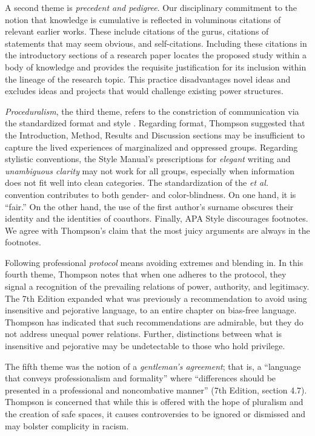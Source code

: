 \documentclass[
  11pt,
]{book}
\begin{document}
A second theme is \emph{precedent and pedigree}. Our disciplinary commitment to the notion that knowledge is cumulative is reflected in voluminous citations of relevant earlier works. These include citations of the gurus, citations of statements that may seem obvious, and self-citations. Including these citations in the introductory sections of a research paper locates the proposed study within a body of knowledge and provides the requisite justification for its inclusion within the lineage of the research topic. This practice disadvantages novel ideas and excludes ideas and projects that would challenge existing power structures.

\emph{Proceduralism}, the third theme, refers to the constriction of communication via the standardized format and style \citep{thompson_gentlemanly_2004}. Regarding format, Thompson suggested that the Introduction, Method, Results and Discussion sections may be insufficient to capture the lived experiences of marginalized and oppressed groups. Regarding stylistic conventions, the Style Manual's prescriptions for \emph{elegant} writing and \emph{unambiguous clarity} may not work for all groups, especially when information does not fit well into clean categories. The standardization of the \emph{et al.} convention contributes to both gender- and color-blindness. On one hand, it is ``fair.'' On the other hand, the use of the first author's surname obscures their identity and the identities of coauthors. Finally, APA Style discourages footnotes. We agree with Thompson's claim that the most juicy arguments are always in the footnotes.

Following professional \emph{protocol} means avoiding extremes and blending in. In this fourth theme, Thompson \citeyearpar{thompson_gentlemanly_2004} notes that when one adheres to the protocol, they signal a recognition of the prevailing relations of power, authority, and legitimacy. The 7th Edition expanded what was previously a recommendation to avoid using insensitive and pejorative language, to an entire chapter on bias-free language. Thompson has indicated that such recommendations are admirable, but they do not address unequal power relations. Further, distinctions between what is insensitive and pejorative may be undetectable to those who hold privilege.

The fifth theme was the notion of a \emph{gentleman's agreement}; that is, a ``language that conveys professionalism and formality'' where ``differences should be presented in a professional and noncombative manner'' (7th Edition, section 4.7). Thompson \citeyearpar{thompson_gentlemanly_2004} is concerned that while this is offered with the hope of pluralism and the creation of safe spaces, it causes controversies to be ignored or dismissed and may bolster complicity in racism.
\end{document}

